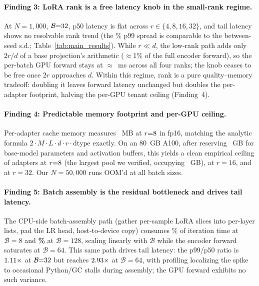 \documentclass[11pt]{article}
\begin{document}
\paragraph{Finding 3: LoRA rank is a free latency knob in the
small-rank regime.}
At $N{=}1{,}000$, $\mathcal{B}{=}32$, p50 latency is flat
across $r \in \{4, 8, 16, 32\}$, and tail latency shows no resolvable
rank trend (the \PNinetyNineRankSpreadPct\% p99 spread is comparable to
the between-seed s.d.; Table~\ref{tab:main_results}). While $r \ll d$, the
low-rank path adds only
$2r/d$ of a base projection's arithmetic ($\approx$1\% of the full encoder
forward), so the per-batch GPU forward stays at
$\approx$\FwdMsAtREight~ms across all four
ranks; the knob ceases to be free once $2r$ approaches $d$.
Within this regime, rank is a pure quality--memory tradeoff: doubling it leaves
forward latency unchanged but doubles the per-adapter footprint, halving the
per-GPU tenant ceiling (Finding~4).

\paragraph{Finding 4: Predictable memory footprint and per-GPU ceiling.}
Per-adapter cache memory measures \LoraBytesREightMB~MB at
$r{=}8$ in fp16, matching the
analytic formula $2 \cdot M \cdot L \cdot d \cdot r \cdot \text{dtype}$ exactly.
On an 80~GB A100, after reserving \BaseActivationOverheadGB~GB for base-model
parameters and activation buffers, this yields a clean empirical ceiling of
\textbf{\CapacityRankEight{}} adapters at $r{=}8$ (the
  largest pool we verified,
occupying \GpuGBAtNFortySevenK~GB), \textbf{\CapacityRankSixteen{}} at
$r{=}16$, and \textbf{\CapacityRankThirtyTwo{}} at $r{=}32$.
Our $N{=}50{,}000$ runs OOM'd at all batch sizes.

\paragraph{Finding 5: Batch assembly is the residual bottleneck and
drives tail latency.}
\label{sec:results_assembly}
The CPU-side batch-assembly path (gather per-sample LoRA slices into
per-layer lists, pad the LR head, host-to-device copy) consumes
\AssemblePctAtBEight\% of iteration time at $\mathcal{B}{=}8$ and
\textbf{\AssemblePctAtBOneTwentyEight\%} at $\mathcal{B}{=}128$, scaling
linearly with $\mathcal{B}$ while the encoder forward saturates at
$\mathcal{B}{=}64$.
This same path drives tail latency: the p99/p50 ratio is
$1.11\times$ at
$\mathcal{B}{=}32$ but reaches
$2.93\times$ at $\mathcal{B}{=}64$, with
profiling localizing the spike to occasional Python/GC stalls during
assembly; the GPU forward exhibits no such variance.
\end{document}
